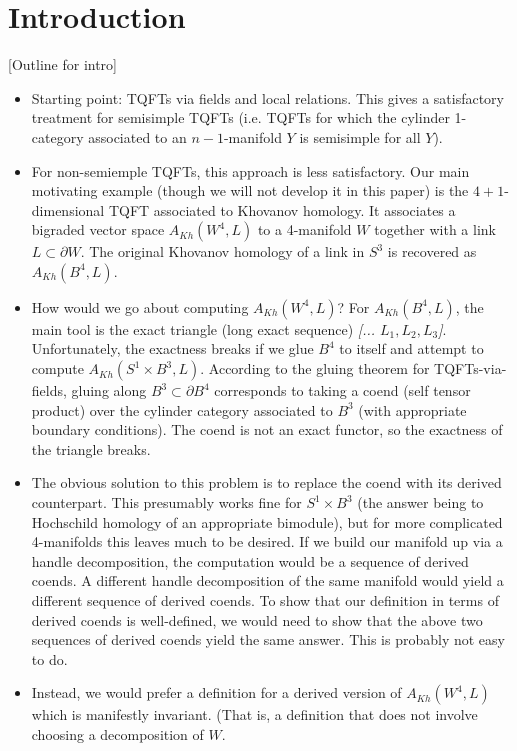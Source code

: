 \documentclass[11pt,leqno]{amsart}
\def\bd{\partial}
\def\nn#1{{{\it \small [#1]}}}
\begin{document}
\section{Introduction}

[Outline for intro]
\begin{itemize}
\item Starting point: TQFTs via fields and local relations.
This gives a satisfactory treatment for semisimple TQFTs
(i.e. TQFTs for which the cylinder 1-category associated to an
$n{-}1$-manifold $Y$ is semisimple for all $Y$).
\item For non-semiemple TQFTs, this approach is less satisfactory.
Our main motivating example (though we will not develop it in this paper)
is the $4{+}1$-dimensional TQFT associated to Khovanov homology.
It associates a bigraded vector space $A_{Kh}(W^4, L)$ to a 4-manifold $W$ together
with a link $L \subset \bd W$.
The original Khovanov homology of a link in $S^3$ is recovered as $A_{Kh}(B^4, L)$.
\item How would we go about computing $A_{Kh}(W^4, L)$?
For $A_{Kh}(B^4, L)$, the main tool is the exact triangle (long exact sequence)
\nn{... $L_1, L_2, L_3$}.
Unfortunately, the exactness breaks if we glue $B^4$ to itself and attempt
to compute $A_{Kh}(S^1\times B^3, L)$.
According to the gluing theorem for TQFTs-via-fields, gluing along $B^3 \subset \bd B^4$
corresponds to taking a coend (self tensor product) over the cylinder category
associated to $B^3$ (with appropriate boundary conditions).
The coend is not an exact functor, so the exactness of the triangle breaks.
\item The obvious solution to this problem is to replace the coend with its derived counterpart.
This presumably works fine for $S^1\times B^3$ (the answer being to Hochschild homology
of an appropriate bimodule), but for more complicated 4-manifolds this leaves much to be desired.
If we build our manifold up via a handle decomposition, the computation
would be a sequence of derived coends.
A different handle decomposition of the same manifold would yield a different
sequence of derived coends.
To show that our definition in terms of derived coends is well-defined, we
would need to show that the above two sequences of derived coends yield the same answer.
This is probably not easy to do.
\item Instead, we would prefer a definition for a derived version of $A_{Kh}(W^4, L)$
which is manifestly invariant.
(That is, a definition that does not
involve choosing a decomposition of $W$.

\end{itemize}
\end{document}
